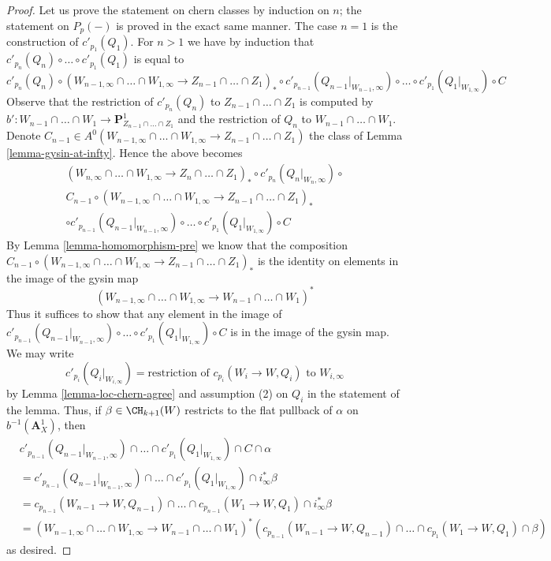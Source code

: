 \begin{proof}
Let us prove the statement on chern classes by induction on $n$;
the statement on $P_p(-)$ is proved in the exact same manner.
The case $n = 1$ is the construction of $c'_{p_1}(Q_1)$.
For $n > 1$ we have by induction that
$c'_{p_n}(Q_n) \circ \ldots \circ c'_{p_1}(Q_1)$ is equal to
$$
c'_{p_n}(Q_n) \circ
(W_{n - 1, \infty} \cap \ldots \cap W_{1, \infty} \to
Z_{n - 1} \cap \ldots \cap Z_1)_* \circ
c'_{p_{n - 1}}(Q_{n - 1}|_{W_{n - 1}, \infty}) \circ \ldots \circ
c'_{p_1}(Q_1|_{W_{1, \infty}})
\circ C
$$
Observe that the restriction of $c'_{p_n}(Q_n)$ to
$Z_{n - 1} \cap \ldots \cap Z_1$ is computed by
$b' : W_{n - 1} \cap \ldots \cap W_1 \to
\mathbf{P}^1_{Z_{n - 1} \cap \ldots \cap Z_1}$
and the restriction of $Q_n$ to $W_{n - 1} \cap \ldots \cap W_1$.
Denote $C_{n - 1} \in A^0(W_{n - 1, \infty} \cap \ldots \cap W_{1, \infty} \to
Z_{n - 1} \cap \ldots \cap Z_1)$ the class of Lemma \ref{lemma-gysin-at-infty}.
Hence the above becomes
\begin{align*}
(W_{n, \infty} \cap \ldots \cap W_{1, \infty} \to
Z_n \cap \ldots \cap Z_1)_* \circ
c'_{p_n}(Q_n|_{W_n, \infty}) \circ \\
C_{n - 1} \circ
(W_{n - 1, \infty} \cap \ldots \cap W_{1, \infty} \to
Z_{n - 1} \cap \ldots \cap Z_1)_* \\
\circ
c'_{p_{n - 1}}(Q_{n - 1}|_{W_{n - 1}, \infty}) \circ \ldots \circ
c'_{p_1}(Q_1|_{W_{1, \infty}})
\circ C
\end{align*}
By Lemma \ref{lemma-homomorphism-pre}
we know that the composition
$C_{n - 1} \circ (W_{n - 1, \infty} \cap \ldots \cap W_{1, \infty} \to
Z_{n - 1} \cap \ldots \cap Z_1)_*$
is the identity on elements in the image of the gysin map
$$
(W_{n - 1, \infty} \cap \ldots \cap W_{1, \infty} \to
W_{n - 1} \cap \ldots \cap W_1)^*
$$
Thus it suffices to show that any element in the image of
$c'_{p_{n - 1}}(Q_{n - 1}|_{W_{n - 1}, \infty}) \circ \ldots \circ
c'_{p_1}(Q_1|_{W_{1, \infty}}) \circ C$
is in the image of the gysin map. We may write
$$
c'_{p_i}(Q_i|_{W_{i, \infty}}) = \text{restriction of } c_{p_i}(W_i \to W, Q_i)
\text{ to } W_{i, \infty}
$$
by Lemma \ref{lemma-loc-chern-agree} and assumption (2) on $Q_i$
in the statement of the lemma. Thus, if $\beta \in \CH_{k + 1}(W)$
restricts to the flat pullback of $\alpha$ on $b^{-1}(\mathbf{A}^1_X)$,
then
\begin{align*}
& c'_{p_{n - 1}}(Q_{n - 1}|_{W_{n - 1}, \infty}) \cap \ldots \cap
c'_{p_1}(Q_1|_{W_{1, \infty}})
\cap C \cap \alpha \\
& =
c'_{p_{n - 1}}(Q_{n - 1}|_{W_{n - 1}, \infty}) \cap \ldots \cap
c'_{p_1}(Q_1|_{W_{1, \infty}})
\cap i_\infty^* \beta \\
& =
c_{p_{n - 1}}(W_{n - 1} \to W, Q_{n - 1}) \cap \ldots \cap
c_{p_{n - 1}}(W_1 \to W, Q_1) \cap i_\infty^* \beta \\
& =
(W_{n - 1, \infty} \cap \ldots \cap W_{1, \infty} \to
W_{n - 1} \cap \ldots \cap W_1)^*
\left(c_{p_{n - 1}}(W_{n - 1} \to W, Q_{n - 1}) \cap \ldots \cap
c_{p_1}(W_1 \to W, Q_1) \cap \beta\right)
\end{align*}
as desired.
\end{proof}

